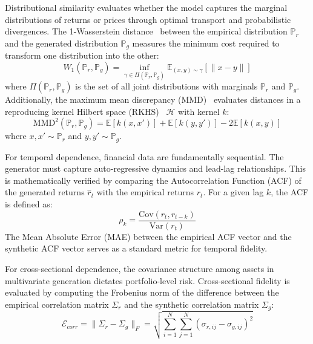 Distributional similarity evaluates whether the model captures the marginal distributions of returns or prices through optimal transport and probabilistic divergences. The 1-Wasserstein distance~\citep{villani2009optimal,arjovsky2017wgan} between the empirical distribution $\mathbb{P}_r$ and the generated distribution $\mathbb{P}_g$ measures the minimum cost required to transform one distribution into the other:
    \begin{equation}
        W_1(\mathbb{P}_r, \mathbb{P}_g) = \inf_{\gamma \in \Pi(\mathbb{P}_r, \mathbb{P}_g)} \mathbb{E}_{(x,y)\sim \gamma}[\|x-y\|]
    \end{equation}
    where $\Pi(\mathbb{P}_r, \mathbb{P}_g)$ is the set of all joint distributions with marginals $\mathbb{P}_r$ and $\mathbb{P}_g$. Additionally, the maximum mean discrepancy (MMD)~\citep{gretton2012kernel} evaluates distances in a reproducing kernel Hilbert space (RKHS)~\citep{aronszajn1950theory} $\mathcal{H}$ with kernel $k$:
    \begin{equation}
        \text{MMD}^2(\mathbb{P}_r, \mathbb{P}_g) = \mathbb{E}[k(x, x')] + \mathbb{E}[k(y, y')] - 2\mathbb{E}[k(x, y)]
    \end{equation}
    where $x, x' \sim \mathbb{P}_r$ and $y, y' \sim \mathbb{P}_g$.

For temporal dependence, financial data are fundamentally sequential. The generator must capture auto-regressive dynamics and lead-lag relationships. This is mathematically verified by comparing the Autocorrelation Function (ACF) of the generated returns $\hat{r}_t$ with the empirical returns $r_t$. For a given lag $k$, the ACF is defined as:
    \begin{equation}
        \rho_k = \frac{\text{Cov}(r_t, r_{t-k})}{\text{Var}(r_t)}
    \end{equation}
The Mean Absolute Error (MAE) between the empirical ACF vector and the synthetic ACF vector serves as a standard metric for temporal fidelity.

For cross-sectional dependence, the covariance structure among assets in multivariate generation dictates portfolio-level risk. Cross-sectional fidelity is evaluated by computing the Frobenius norm of the difference between the empirical correlation matrix $\Sigma_r$ and the synthetic correlation matrix $\Sigma_g$:
    \begin{equation}
        \mathcal{E}_{corr} = \|\Sigma_r - \Sigma_g\|_F = \sqrt{\sum_{i=1}^N \sum_{j=1}^N (\sigma_{r, ij} - \sigma_{g, ij})^2}
    \end{equation}


